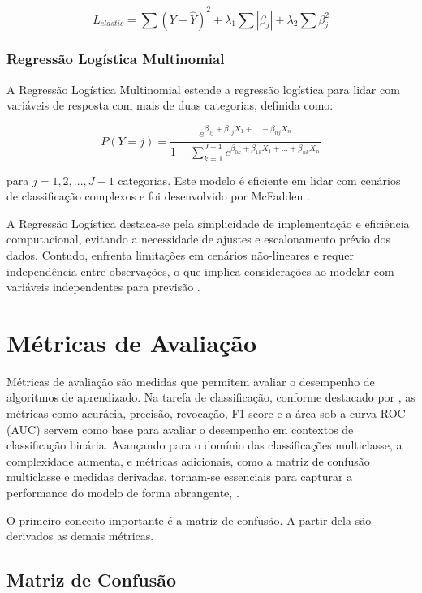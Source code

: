 \begin{equation}
L_{elastic} = \sum (Y - \hat{Y})^2 + \lambda_1\sum |\beta_j| + \lambda_2\sum \beta_j^2
\end{equation}

\subsubsection{Regressão Logística Multinomial}

A Regressão Logística Multinomial estende a regressão logística para lidar com variáveis de resposta com mais de duas categorias, definida como:

\[ P(Y=j) = \frac{e^{\beta_{0j} + \beta_{1j}X_1 + ... + \beta_{nj}X_n}}{1 + \sum_{k=1}^{J-1} e^{\beta_{0k} + \beta_{1k}X_1 + ... + \beta_{nk}X_n}} \]

para \(j = 1, 2, ..., J-1\) categorias. Este modelo é eficiente em lidar com cenários de classificação complexos e foi desenvolvido por McFadden \cite{mcfadden1973conditional}.

A Regressão Logística destaca-se pela simplicidade de implementação e eficiência computacional, evitando a necessidade de ajustes e escalonamento prévio dos dados. Contudo, enfrenta limitações em cenários não-lineares e requer independência entre observações, o que implica considerações ao modelar com variáveis independentes para previsão \cite{kowsari2019text}.

\section{Métricas de Avaliação}

Métricas de avaliação são medidas que permitem avaliar o desempenho de algoritmos de aprendizado.  Na tarefa de classificação, conforme destacado por \cite{tharwat2018}, as métricas como acurácia, precisão, revocação, F1-score e a área sob a curva ROC (AUC) servem como base para avaliar o desempenho em contextos de classificação binária.  
Avançando para o domínio das classificações multiclasse, a complexidade aumenta, e métricas adicionais, como a matriz de confusão multiclasse e medidas derivadas, tornam-se essenciais para capturar a performance do modelo de forma abrangente, \cite{grandini2020metrics}.

O primeiro conceito importante é a matriz de confusão.  A partir dela são derivados as demais métricas.

\subsection{Matriz de Confusão}

